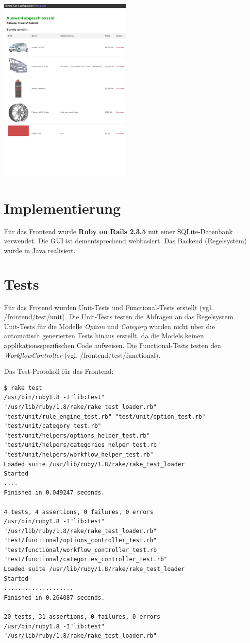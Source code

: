 \documentclass[a4paper,10pt]{article}
\begin{document}
\\
\includegraphics[width=0.5\textwidth]{screenshots/screenshot7.eps}

\section{Implementierung}

Für das Frontend wurde \textbf{Ruby on Rails 2.3.5} mit einer SQLite-Datenbank verwendet.
Die GUI ist dementsprechend webbasiert.
Das Backend (Regelsystem) wurde in Java realisiert. 

\section{Tests}

Für das Frotend wurden Unit-Tests und Functional-Tests erstellt (vgl. /frontend/test/unit).
Die Unit-Tests testen die Abfragen an das Regelsystem.
Unit-Tests für die Modelle \textit{Option} und \textit{Category} wurden nicht über die automatisch generierten Tests hinaus erstellt, da die Models keinen applikationsspezifischen Code aufweisen.
Die Functional-Tests testen den \textit{WorkflowController} (vgl. /frontend/test/functional).

Das Test-Protokoll für das Frontend:

\begin{lstlisting}
$ rake test
/usr/bin/ruby1.8 -I"lib:test" "/usr/lib/ruby/1.8/rake/rake_test_loader.rb" "test/unit/rule_engine_test.rb" "test/unit/option_test.rb" "test/unit/category_test.rb" "test/unit/helpers/options_helper_test.rb" "test/unit/helpers/categories_helper_test.rb" "test/unit/helpers/workflow_helper_test.rb" 
Loaded suite /usr/lib/ruby/1.8/rake/rake_test_loader
Started
....
Finished in 0.049247 seconds.

4 tests, 4 assertions, 0 failures, 0 errors
/usr/bin/ruby1.8 -I"lib:test" "/usr/lib/ruby/1.8/rake/rake_test_loader.rb" "test/functional/options_controller_test.rb" "test/functional/workflow_controller_test.rb" "test/functional/categories_controller_test.rb" 
Loaded suite /usr/lib/ruby/1.8/rake/rake_test_loader
Started
....................
Finished in 0.264087 seconds.

20 tests, 31 assertions, 0 failures, 0 errors
/usr/bin/ruby1.8 -I"lib:test" "/usr/lib/ruby/1.8/rake/rake_test_loader.rb"  
\end{lstlisting}
\end{document}
